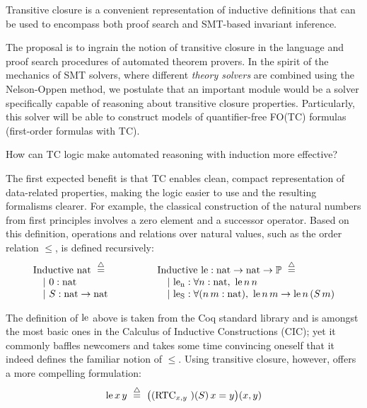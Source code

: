 \begin{proposal}Transitive closure is a convenient representation of inductive definitions that can be used to encompass both proof search and SMT-based invariant inference.
\end{proposal}


The proposal is to ingrain the notion of transitive closure in the language and proof search procedures of automated theorem provers.
In the spirit of the mechanics of SMT solvers, where different \emph{theory solvers} are combined using the Nelson-Oppen method,
we postulate that an important module would be a solver specifically capable of reasoning
about transitive closure properties.
Particularly, this solver will be able to construct models of quantifier-free
FO(TC) formulas (first-order formulas with TC).

\begin{researchquestion}How can TC logic make automated reasoning with induction more effective?
\end{researchquestion}

The first expected benefit is that TC enables clean, compact representation of data-related properties,
making the logic easier to use and the resulting formalisms clearer.
For example, the classical construction of the natural numbers from first principles involves a zero element and a successor operator.
Based on this definition, operations and relations over natural values, such as the order relation $\leq$, is defined recursively:
\[
\begin{array}{l@{\hspace{4em}}l}
\begin{array}[t]{l}
\rInductive~\tnat~\eqdef \\
\quad |~0 : \tnat \\
\quad |~S : \tnat \to\tnat
\end{array}
&
\begin{array}[t]{l}
\rInductive~\fle : \tnat \to \tnat \to \tProp ~\eqdef \\
\quad |~\fctorlen : \forall n:\tnat,~ \fle\,n\,n\\
\quad |~\fctorleS : \forall (n\,m:\tnat),~ \fle\,n\,m\to\fle\,n\,(S\,m)
\end{array}
\end{array}
\]

The definition of $\mathrm{le}$ above is taken from the Coq standard library and is amongst the most basic ones in the Calculus of Inductive Constructions (CIC); yet it commonly baffles newcomers and takes some time convincing oneself that it indeed defines the familiar notion of $\leq$.
Using transitive closure, however, offers a more compelling formulation:
\[
\mathrm{le}\,x\,y ~\overset{\triangle}{=}~ \big((\mathrm{RTC}_{x,y}\,\,)(S)\,x=y\big)(x,y)
\]


